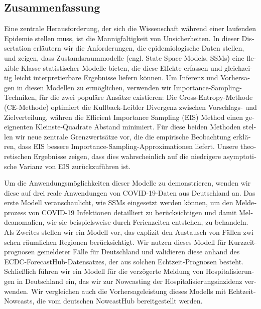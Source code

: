 \begin{otherlanguage}{ngerman}
\chapter*{Zusammenfassung}
Eine zentrale Herausforderung, der sich die Wissenschaft während einer laufenden Epidemie stellen muss, ist die Mannigfaltigkeit von Unsicherheiten. In dieser Dissertation erläutern wir die Anforderungen, die epidemiologische Daten stellen, und zeigen, dass Zustandsraummodelle (engl. State Space Models, SSMs) eine flexible Klasse statistischer Modelle bieten, die diese Effekte erfassen und gleichzeitig leicht interpretierbare Ergebnisse liefern können.
Um Inferenz und Vorhersagen in diesen Modellen zu ermöglichen, verwenden wir Importance-Sampling-Techniken, für die zwei populäre Ansätze existieren: Die Cross-Entropy-Methode (CE-Methode) optimiert die Kullback-Leibler Divergenz zwischen Vorschlags- und Zielverteilung, währen die Efficient Importance Sampling (EIS) Method einen geeignenten Kleinste-Quadrate Abstand minimiert.
Für diese beiden Methoden stellen wir neue zentrale Grenzwertsätze vor, die die empirische Beobachtung erklären, dass EIS bessere Importance-Sampling-Approximationen liefert. Unsere theoretischen Ergebnisse zeigen, dass dies wahrscheinlich auf die niedrigere asymptotische Varianz von EIS zurückzuführen ist.

Um die Anwendungsmöglichkeiten dieser Modelle zu demonstrieren, wenden wir diese auf drei reale Anwendungen von COVID-19-Daten aus Deutschland an.
Das erste Modell veranschaulicht, wie SSMs eingesetzt werden können, um den Meldeprozess von COVID-19 Infektionen detailliert zu berücksichtigen und damit Meldeanomalien, wie sie beispielsweise durch Ferienzeiten entstehen, zu behandeln.
Als Zweites stellen wir ein Modell vor, das explizit den Austausch von Fällen zwischen räumlichen Regionen berücksichtigt. Wir nutzen dieses Modell für Kurzzeitprognosen gemeldeter Fälle für Deutschland und validieren diese anhand des ECDC-ForecastHub-Datensatzes, der aus solchen Echtzeit-Prognosen besteht.
Schließlich führen wir ein Modell für die verzögerte Meldung von Hospitalisierungen in Deutschland ein, das wir zur Nowcasting der Hospitalisierungsinzidenz verwenden. Wir vergleichen auch die Vorhersageleistung dieses Modells mit Echtzeit-Nowcasts, die vom deutschen NowcastHub bereitgestellt werden.

\end{otherlanguage}

\endgroup

\vfill